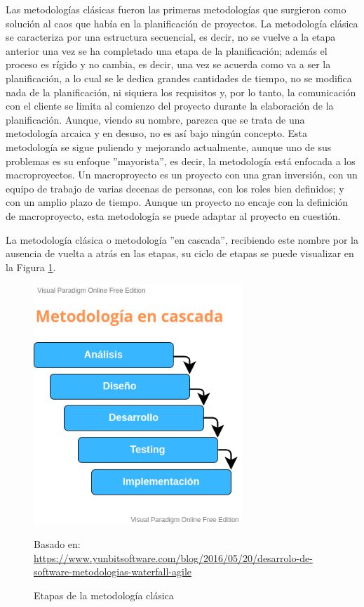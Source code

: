 Las metodologías clásicas fueron las primeras metodologías que surgieron como solución al caos que había en la planificación de proyectos. La metodología clásica se caracteriza por una estructura secuencial, es decir, no se vuelve a la etapa anterior una vez se ha completado una etapa de la planificación; además el proceso es rígido y no cambia, es decir, una vez se acuerda como va a ser la planificación, a lo cual se le dedica grandes cantidades de tiempo, no se modifica nada de la planificación, ni siquiera los requisitos y, por lo tanto, la comunicación con el cliente se limita al comienzo del proyecto durante la elaboración de la planificación. Aunque, viendo su nombre, parezca que se trata de una metodología arcaica y en desuso, no es así bajo ningún concepto. Esta metodología se sigue puliendo y mejorando actualmente, aunque uno de sus problemas es su enfoque ''mayorista'', es decir, la metodología está enfocada a los macroproyectos. Un macroproyecto es un proyecto con una gran inversión, con un equipo de trabajo de varias decenas de personas, con los roles bien definidos; y con un amplio plazo de tiempo. Aunque un proyecto no encaje con la definición de macroproyecto, esta metodología se puede adaptar al proyecto en cuestión.

La metodología clásica o metodología ''en cascada'', recibiendo este nombre por la ausencia de vuelta a atrás en las etapas, su ciclo de etapas se puede visualizar en la Figura \ref{fig:etapas_clasica}.

\begin{figure}[h]
\centering
\includegraphics[width=0.7\textwidth]{imagenes/03_Analisis/meto_clasica.png}
\label{fig:etapas_clasica}
\begin{center}
Basado en: \url{https://www.yunbitsoftware.com/blog/2016/05/20/desarrolo-de-software-metodologias-waterfall-agile}
\end{center}
\caption{Etapas de la metodología clásica}
\end{figure}

